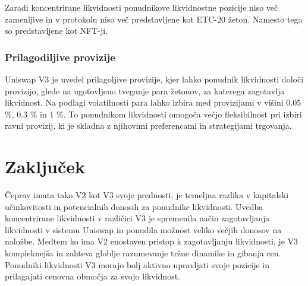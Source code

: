 \documentclass[a4paper,12pt]{article}%
\begin{document}
Zaradi koncentrirane likvidnosti ponudnikove likvidnostne pozicije niso več zamenljive in v protokolu niso več predstavljene kot ETC-20 žeton. Namesto tega so predstavljene kot NFT-ji. 


\subsubsection{Prilagodiljive provizije}
Uniswap V3 je uvedel prilagoljive provizije, kjer lahko ponudnik likvidnosti določi provizijo, glede na ugotovljeno tveganje para žetonov, za katerega zagotavlja likvidnost. Na podlagi volatilnosti para lahko izbira med provizijami v višini 0.05 \%, 0.3 \% in 1 \%. 
To ponudnikom likvidnosti omogoča večjo fleksibilnost pri izbiri ravni provizij, ki je skladna z njihovimi preferencami in strategijami trgovanja.



\section{Zaključek}

Čeprav imata tako V2 kot V3 svoje prednosti, je temeljna razlika v kapitalski učinkovitosti in potencialnih donosih za ponudnike likvidnosti. Uvedba koncentrirane likvidnosti v različici V3 je spremenila način zagotavljanja likvidnosti v sistemu Uniswap in ponudila možnost veliko večjih donosov na naložbe. Medtem ko ima V2 enostaven pristop k zagotavljanju likvidnosti, je V3 kompleknejša in zahteva globlje razumevanje tržne dinamike in gibanja cen. Ponudniki likvidnosti V3 morajo bolj aktivno upravljati svoje pozicije in prilagajati cenovna območja za svojo likvidnost. 




\end{document}
